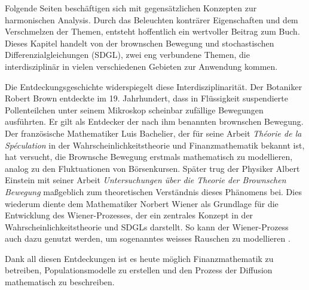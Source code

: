 %
%
%
%

Folgende Seiten beschäftigen sich mit gegensätzlichen Konzepten zur harmonischen Analysis. Durch das Beleuchten konträrer Eigenschaften und dem Verschmelzen der Themen, entsteht hoffentlich ein wertvoller Beitrag zum Buch. Dieses Kapitel handelt von der brownschen Bewegung und stochastischen Differenzialgleichungen (SDGL), zwei eng verbundene Themen, die interdisziplinär in vielen verschiedenen Gebieten zur Anwendung kommen.

Die Entdeckungsgeschichte widerspiegelt diese Interdisziplinarität. Der Botaniker Robert Brown entdeckte im 19. Jahrhundert, dass in Flüssigkeit suspendierte Pollenteilchen unter seinem Mikroskop scheinbar zufällige Bewegungen ausführten. Er gilt als Entdecker der nach ihm benannten brownschen Bewegung. Der französische Mathematiker Luis Bachelier, der für seine Arbeit \textit{Théorie de la Spéculation} in der Wahrscheinlichkeitstheorie und Finanzmathematik bekannt ist, hat versucht, die Brownsche Bewegung erstmals mathematisch zu modellieren, analog zu den Fluktuationen von Börsenkursen. Später trug der Physiker Albert Einstein mit seiner Arbeit \textit{Untersuchungen über die Theorie der Brownschen Bewegung} maßgeblich zum theoretischen Verständnis dieses Phänomens bei. Dies wiederum diente dem Mathematiker Norbert Wiener als Grundlage für die Entwicklung des Wiener-Prozesses, der ein zentrales Konzept in der Wahrscheinlichkeitstheorie und SDGLs darstellt. So kann der Wiener-Prozess auch dazu genutzt werden, um sogenanntes weisses Rauschen zu modellieren .

Dank all diesen Entdeckungen ist es heute möglich Finanzmathematik zu betreiben, Populationsmodelle zu erstellen und den Prozess der Diffusion mathematisch zu beschreiben. %